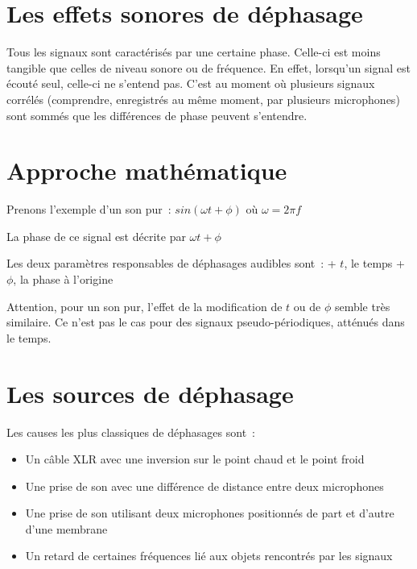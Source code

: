 \documentclass[
]{book}
\providecommand{\tightlist}{%
  \setlength{\itemsep}{0pt}\setlength{\parskip}{0pt}}
\begin{document}
\hypertarget{les-effets-sonores-de-duxe9phasage}{%
\section{Les effets sonores de déphasage}\label{les-effets-sonores-de-duxe9phasage}}

Tous les signaux sont caractérisés par une certaine phase. Celle-ci est moins tangible que celles de niveau sonore ou de fréquence. En effet, lorsqu'un signal est écouté seul, celle-ci ne s'entend pas. C'est au moment où plusieurs signaux corrélés (comprendre, enregistrés au même moment, par plusieurs microphones) sont sommés que les différences de phase peuvent s'entendre.

\hypertarget{approche-mathuxe9matique}{%
\section{Approche mathématique}\label{approche-mathuxe9matique}}

Prenons l'exemple d'un son pur~:
\(sin (\omega t + \phi)\) où \(\omega = 2\pi f\)

La phase de ce signal est décrite par \(\omega t +\phi\)

Les deux paramètres responsables de déphasages audibles sont~:
+ \(t\), le temps
+ \(\phi\), la phase à l'origine

Attention, pour un son pur, l'effet de la modification de \(t\) ou de \(\phi\) semble très similaire. Ce n'est pas le cas pour des signaux pseudo-périodiques, atténués dans le temps.

\hypertarget{les-sources-de-duxe9phasage}{%
\section{Les sources de déphasage}\label{les-sources-de-duxe9phasage}}

Les causes les plus classiques de déphasages sont~:

\begin{itemize}
\tightlist
\item
  Un câble XLR avec une inversion sur le point chaud et le point froid
\item
  Une prise de son avec une différence de distance entre deux microphones
\item
  Une prise de son utilisant deux microphones positionnés de part et d'autre d'une membrane
\item
  Un retard de certaines fréquences lié aux objets rencontrés par les signaux
\end{itemize}
\end{document}
